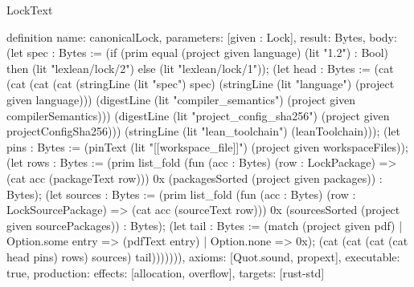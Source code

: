 \begin{lexlean}{LockText}
\begin{semanticmodule}
definition{
  name: canonicalLock,
  parameters: [given : Lock],
  result: Bytes,
  body: (let spec : Bytes := (if (prim equal (project given language) (lit "1.2") : Bool) then (lit "lexlean/lock/2") else (lit "lexlean/lock/1")); (let head : Bytes := (cat (cat (cat (cat (stringLine (lit "spec") spec) (stringLine (lit "language") (project given language))) (digestLine (lit "compiler_semantics") (project given compilerSemantics))) (digestLine (lit "project_config_sha256") (project given projectConfigSha256))) (stringLine (lit "lean_toolchain") (leanToolchain))); (let pins : Bytes := (pinText (lit "[[workspace_file]]") (project given workspaceFiles)); (let rows : Bytes := (prim list_fold (fun (acc : Bytes) (row : LockPackage) => (cat acc (packageText row))) 0x (packagesSorted (project given packages)) : Bytes); (let sources : Bytes := (prim list_fold (fun (acc : Bytes) (row : LockSourcePackage) => (cat acc (sourceText row))) 0x (sourcesSorted (project given sourcePackages)) : Bytes); (let tail : Bytes := (match (project given pdf)
    | Option.some entry => (pdfText entry)
    | Option.none => 0x); (cat (cat (cat (cat head pins) rows) sources) tail))))))),
  axioms: [Quot.sound, propext],
  executable: true,
  production: {effects: [allocation, overflow], targets: [rust-std]}
}
\end{semanticmodule}
\end{lexlean}
